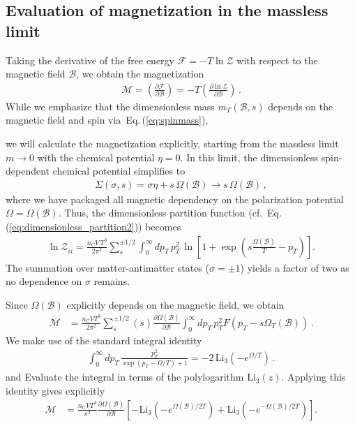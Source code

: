 \documentclass[epjST]{svjour}
\newcommand{\req}[1]{Eq.\,(\ref{#1})}
\begin{document}
\subsection{Evaluation of magnetization in the massless limit}
\label{sec:magnetization_evaluation}
Taking the derivative of the free energy \(\mathcal{F} = -T \ln\mathcal{Z}\) with respect to the magnetic field \(\mathcal{B}\), we obtain the magnetization
\begin{align}
\label{eq:magnetization_def}
\mathcal{M} = \left( \frac{\partial \mathcal{F}}{\partial \mathcal{B}} \right) = -T \left( \frac{\partial \ln\mathcal{Z}}{\partial \mathcal{B}} \right)\,.
\end{align} 
While we emphasize that the dimensionless mass \(m_{T}(\mathcal{B},s)\) depends on the magnetic field and spin via~\req{eq:spinmass}, {\color{blue}we will calculate the magnetization explicitly, starting from the massless limit \(m\to 0\) with the chemical potential \(\eta=0\). In this limit, the dimensionless spin-dependent chemical potential simplifies to
\begin{align}
\Sigma(\sigma,s) = \sigma\eta + s\,\Omega(\mathcal{B}) \rightarrow s\,\Omega(\mathcal{B})\,,
\end{align}
where we have packaged all magnetic dependency on the polarization potential \(\Omega=\Omega(\mathcal{B})\). Thus, the dimensionless partition function (cf.~\req{eq:dimensionless_partition2}) becomes
\begin{align}
\ln\mathcal{Z}_{i\bar{i}} 
= \frac{n_\mathrm{C}V\,T^{3}}{2\pi^{2}}\sum_{s}^{\pm1/2}\int_{0}^{\infty}dp_{T}\,p_{T}^{2}\,\ln\left[1+\exp\left(s\frac{\Omega(\mathcal{B})}{T}-p_{T}\right)\right].
\end{align}
The summation over matter-antimatter states (\(\sigma=\pm1\)) yields a factor of two as no dependence on \(\sigma\) remains.

Since \(\Omega(\mathcal{B})\) explicitly depends on the magnetic field, we obtain
\begin{align}
\mathcal{M} &= \frac{n_\mathrm{C}VT^{3}}{2\pi^{2}}\sum_{s}^{\pm 1/2}(s)\frac{\partial\Omega(\mathcal{B})}{\partial\mathcal{B}}\int_{0}^{\infty}dp_{T}\,p_{T}^{2}F\left(p_{T}-s\Omega_{T}(\mathcal{B})\right)\,.
\end{align}
We make use of the standard integral identity
\begin{align}
\int_{0}^{\infty} dp_{T}\,\frac{p_{T}^{2}}{\exp\left(p_{T}-\Omega/T\right)+1} = -2\,\mathrm{Li}_3(-e^{\Omega/T})\,.
\end{align}
and Evaluate the integral in terms of the polylogarithm \(\mathrm{Li}_3(z)\). Applying this identity gives explicitly
\begin{align}
\label{eq:FinalMagnetization}
\mathcal{M} &= \frac{n_\mathrm{C}VT^{3}}{\pi^{2}}\frac{\partial\Omega(\mathcal{B})}{\partial\mathcal{B}}\left[-\mathrm{Li}_3\left(-e^{\Omega(\mathcal{B})/2T}\right)+\mathrm{Li}_3\left(-e^{-\Omega(\mathcal{B})/2T}\right)\right].
\end{align}

}
\end{document}
